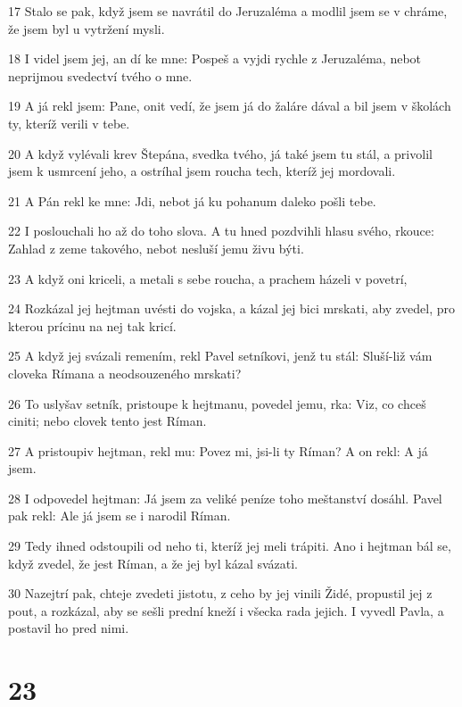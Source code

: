 \par 17 Stalo se pak, když jsem se navrátil do Jeruzaléma a modlil jsem se v chráme, že jsem byl u vytržení mysli.
\par 18 I videl jsem jej, an dí ke mne: Pospeš a vyjdi rychle z Jeruzaléma, nebot neprijmou svedectví tvého o mne.
\par 19 A já rekl jsem: Pane, onit vedí, že jsem já do žaláre dával a bil jsem v školách ty, kteríž verili v tebe.
\par 20 A když vylévali krev Štepána, svedka tvého, já také jsem tu stál, a privolil jsem k usmrcení jeho, a ostríhal jsem roucha tech, kteríž jej mordovali.
\par 21 A Pán rekl ke mne: Jdi, nebot já ku pohanum daleko pošli tebe.
\par 22 I poslouchali ho až do toho slova. A tu hned pozdvihli hlasu svého, rkouce: Zahlad z zeme takového, nebot nesluší jemu živu býti.
\par 23 A když oni kriceli, a metali s sebe roucha, a prachem házeli v povetrí,
\par 24 Rozkázal jej hejtman uvésti do vojska, a kázal jej bici mrskati, aby zvedel, pro kterou prícinu na nej tak kricí.
\par 25 A když jej svázali remením, rekl Pavel setníkovi, jenž tu stál: Sluší-liž vám cloveka Rímana a neodsouzeného mrskati?
\par 26 To uslyšav setník, pristoupe k hejtmanu, povedel jemu, rka: Viz, co chceš ciniti; nebo clovek tento jest Ríman.
\par 27 A pristoupiv hejtman, rekl mu: Povez mi, jsi-li ty Ríman? A on rekl: A já jsem.
\par 28 I odpovedel hejtman: Já jsem za veliké peníze toho meštanství dosáhl. Pavel pak rekl: Ale já jsem se i narodil Ríman.
\par 29 Tedy ihned odstoupili od neho ti, kteríž jej meli trápiti. Ano i hejtman bál se, když zvedel, že jest Ríman, a že jej byl kázal svázati.
\par 30 Nazejtrí pak, chteje zvedeti jistotu, z ceho by jej vinili Židé, propustil jej z pout, a rozkázal, aby se sešli prední kneží i všecka rada jejich. I vyvedl Pavla, a postavil ho pred nimi.

\chapter{23}

